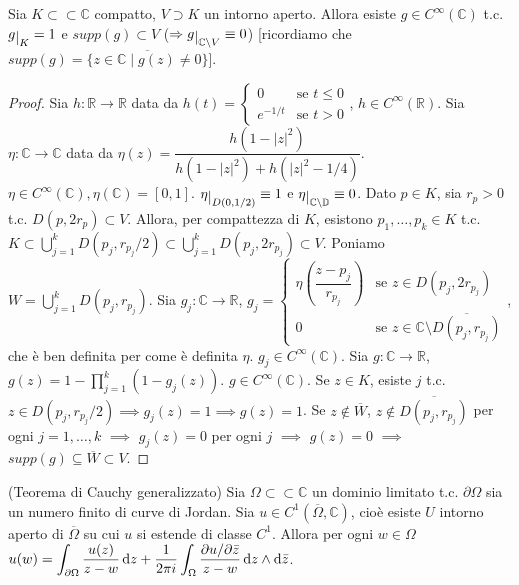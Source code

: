 \begin{lm}
  Sia $K \subset \subset \mathbb{C}$ compatto, $V \supset K$ un intorno aperto. Allora esiste $g \in C^{\infty}(\mathbb{C})$ t.c. $g\restrict{K}=1$ e $supp(g) \subset V$ ($\implies g\restrict{\mathbb{C}\setminus V}\equiv 0$) [ricordiamo che $supp(g)=\overline{\{z \in \mathbb{C} \mid g(z)\not=0\}}$].
\end{lm}

\begin{proof}
  Sia $h: \mathbb{R} \longrightarrow \mathbb{R}$ data da $h(t)=\begin{cases}
    0 & \mbox{se }t\le 0\\ e^{-1/t} & \mbox{se }t>0
\end{cases}$, $h \in C^{\infty}(\mathbb{R})$. Sia $\eta: \mathbb{C} \longrightarrow \mathbb{C}$ data da $\eta(z)=\dfrac{h(1-|z|^2)}{h(1-|z|^2)+h(|z|^2-1/4)}$. $\eta \in C^{\infty}(\mathbb{C}), \eta(\mathbb{C})=[0, 1]$.
$\eta\restrict{D(0, 1/2)}\equiv 1$ e $\eta\restrict{\mathbb{C}\setminus \mathbb{D}} \equiv 0$. Dato $p \in K$, sia $r_p>0$ t.c. $D(p, 2r_p) \subset V$.
Allora, per compattezza di $K$, esistono $p_1, \dots, p_k \in K$ t.c. $\displaystyle K \subset \bigcup_{j=1}^k D(p_j, r_{p_j}/2) \subset \bigcup_{j=1}^k D(p_j, 2r_{p_j}) \subset V$. Poniamo $\displaystyle W=\bigcup_{j=1}^k D(p_j, r_{p_j})$.
Sia $g_j:\mathbb{C} \longrightarrow \mathbb{R}$, $g_j=\begin{cases}
  \eta\left(\dfrac{z-p_j}{r_{p_j}}\right) & \mbox{se }z\in D(p_j, 2r_{p_j})\\ 0 & \mbox{se }z\in\mathbb{C} \setminus \overline{D(p_j, r_{p_j})}
\end{cases}$, che è ben definita per come è definita $\eta$. $g_j \in C^{\infty}(\mathbb{C})$. Sia $g: \mathbb{C} \longrightarrow \mathbb{R}$, $\displaystyle g(z)=1-\prod_{j=1}^k (1-g_j(z))$. $g \in C^{\infty}(\mathbb{C})$.
Se $z \in K$, esiste $j$ t.c. $z \in D(p_j, r_{p_j}/2) \implies g_j(z)=1 \implies g(z)=1$. Se $z \not\in \overline{W}$, $z \not\in\overline{D(p_j, r_{p_j})}$ per ogni $j=1, \dots, k$ $\implies$ $g_j(z)=0$ per ogni $j$ $\implies$ $g(z)=0$ $\implies$ $supp(g) \subseteq \overline{W} \subset V$.
\end{proof}

\begin{thm}
  (Teorema di Cauchy generalizzato) Sia $\Omega \subset \subset \mathbb{C}$ un dominio limitato t.c. $\partial\Omega$ sia un numero finito di curve di Jordan. Sia $u \in C^1(\overline{\Omega}, \mathbb{C})$, cioè esiste $U$ intorno aperto di $\overline{\Omega}$ su cui $u$ si estende di classe $C^1$.
  Allora per ogni $w \in \Omega$ $\displaystyle u(w)=\int_{\partial \Omega} \dfrac{u(z)}{z-w}\mathop{}\!\mathrm{d} z+\dfrac{1}{2\pi i}\int_{\Omega} \dfrac{\partial u/\partial\bar{z}}{z-w}\mathop{}\!\mathrm{d} z \wedge \mathop{}\!\mathrm{d} \bar{z}$.
\end{thm}

